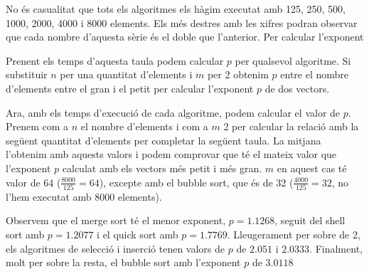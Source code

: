 No és casualitat que tots els algoritmes els hàgim executat amb 125, 250, 500, 1000, 2000, 4000 i 8000 elements.
Els més destres amb les xifres podran observar que cada nombre d'aquesta sèrie és el doble que l'anterior.
Per calcular l'exponent

\vspace*{1em}
\noindent
\makebox[\textwidth][c]{
	
}
\vspace*{1em}

Prenent els temps d'aquesta taula podem calcular $p$ per qualsevol algoritme.
Si substituir $n$ per una quantitat d'elements i $m$ per 2 obtenim $p$ entre el nombre d'elements entre el gran i el petit per calcular l'exponent $p$ de dos vectors.


Ara, amb els temps d'execució de cada algoritme, podem calcular el valor de $p$.
Prenem com a $n$ el nombre d'elements i com a $m$ 2 per calcular la relació amb la següent quantitat d'elements per completar la següent taula.
La mitjana l'obtenim amb aquests valors i podem comprovar que té el mateix valor que l'exponent $p$ calculat amb els vectors més petit i més gran. $m$ en aquest cas té valor de 64 ($\frac{8000}{125} = 64$), excepte amb el bubble sort, que és de 32 ($\frac{4000}{125} = 32$, no l'hem executat amb 8000 elements).

\vspace*{1em}
\noindent
\makebox[\textwidth][c]{
	
}
\vspace*{1em}

Observem que el merge sort té el menor exponent, $p=1.1268$, seguit del shell sort amb $p=1.2077$ i el quick sort amb $p=1.7769$.
Lleugerament per sobre de 2, els algoritmes de selecció i inserció tenen valors de $p$ de $2.051$ i $2.0333$.
Finalment, molt per sobre la resta, el bubble sort amb l'exponent $p$ de $3.0118$

\begin{center}
	
\end{center}